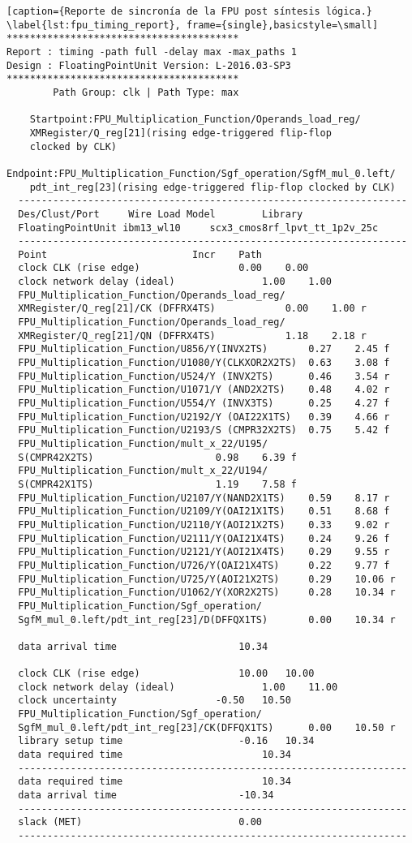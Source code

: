 \begin{lstlisting}[caption={Reporte de sincronía de la FPU post síntesis lógica.} \label{lst:fpu_timing_report}, frame={single},basicstyle=\small]
****************************************
Report : timing -path full -delay max -max_paths 1
Design : FloatingPointUnit Version: L-2016.03-SP3
****************************************
		Path Group: clk | Path Type: max
	
    Startpoint:FPU_Multiplication_Function/Operands_load_reg/
    XMRegister/Q_reg[21](rising edge-triggered flip-flop 
    clocked by CLK)
    Endpoint:FPU_Multiplication_Function/Sgf_operation/SgfM_mul_0.left/
    pdt_int_reg[23](rising edge-triggered flip-flop clocked by CLK)
  -------------------------------------------------------------------
  Des/Clust/Port     Wire Load Model       	Library
  FloatingPointUnit	ibm13_wl10     scx3_cmos8rf_lpvt_tt_1p2v_25c
  -------------------------------------------------------------------
  Point							Incr	Path
  clock CLK (rise edge)					0.00	0.00
  clock network delay (ideal)				1.00	1.00
  FPU_Multiplication_Function/Operands_load_reg/
  XMRegister/Q_reg[21]/CK (DFFRX4TS)			0.00	1.00 r
  FPU_Multiplication_Function/Operands_load_reg/
  XMRegister/Q_reg[21]/QN (DFFRX4TS)			1.18	2.18 r
  FPU_Multiplication_Function/U856/Y(INVX2TS)		0.27	2.45 f
  FPU_Multiplication_Function/U1080/Y(CLKXOR2X2TS)	0.63	3.08 f
  FPU_Multiplication_Function/U524/Y (INVX2TS)		0.46	3.54 r
  FPU_Multiplication_Function/U1071/Y (AND2X2TS)	0.48	4.02 r
  FPU_Multiplication_Function/U554/Y (INVX3TS)		0.25	4.27 f
  FPU_Multiplication_Function/U2192/Y (OAI22X1TS)	0.39	4.66 r
  FPU_Multiplication_Function/U2193/S (CMPR32X2TS)	0.75	5.42 f
  FPU_Multiplication_Function/mult_x_22/U195/
  S(CMPR42X2TS)						0.98	6.39 f
  FPU_Multiplication_Function/mult_x_22/U194/
  S(CMPR42X1TS)						1.19	7.58 f
  FPU_Multiplication_Function/U2107/Y(NAND2X1TS)	0.59	8.17 r
  FPU_Multiplication_Function/U2109/Y(OAI21X1TS)	0.51	8.68 f
  FPU_Multiplication_Function/U2110/Y(AOI21X2TS)	0.33	9.02 r
  FPU_Multiplication_Function/U2111/Y(OAI21X4TS)	0.24	9.26 f
  FPU_Multiplication_Function/U2121/Y(AOI21X4TS)	0.29	9.55 r
  FPU_Multiplication_Function/U726/Y(OAI21X4TS)		0.22	9.77 f
  FPU_Multiplication_Function/U725/Y(AOI21X2TS)		0.29	10.06 r
  FPU_Multiplication_Function/U1062/Y(XOR2X2TS)		0.28	10.34 r
  FPU_Multiplication_Function/Sgf_operation/
  SgfM_mul_0.left/pdt_int_reg[23]/D(DFFQX1TS)		0.00	10.34 r
  
  data arrival time						10.34
  
  clock CLK (rise edge)					10.00	10.00
  clock network delay (ideal)				1.00	11.00
  clock uncertainty					-0.50	10.50
  FPU_Multiplication_Function/Sgf_operation/
  SgfM_mul_0.left/pdt_int_reg[23]/CK(DFFQX1TS)		0.00	10.50 r
  library setup time					-0.16	10.34
  data required time						10.34
  -------------------------------------------------------------------
  data required time						10.34
  data arrival time						-10.34
  -------------------------------------------------------------------
  slack (MET)							0.00
  -------------------------------------------------------------------
  

\end{lstlisting}

